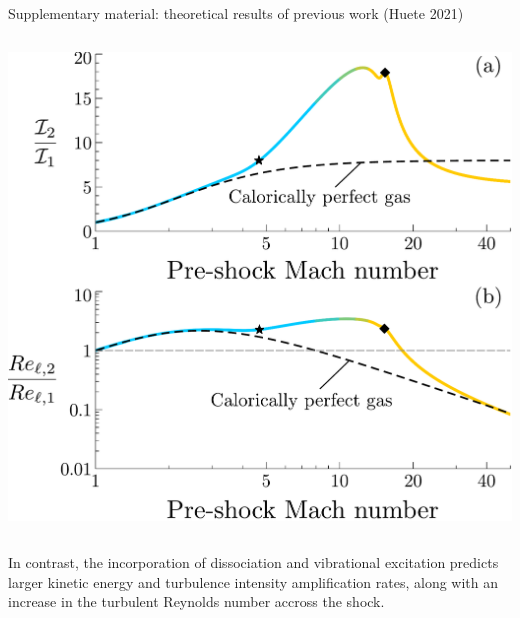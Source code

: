 \documentclass[9pt, aspectratio=1609]{beamer}
\begin{document}
\begin{frame}{\large Supplementary material: theoretical results of previous work (Huete 2021)}
\begin{columns}[c]
\begin{column}{.45\textwidth}
\begin{center}
        \includegraphics[width=1\textwidth]{figures/huete2021/Ratios_APS_alpha.pdf}
    \end{center}
    \end{column}%
\end{columns}
\vspace{0.3cm}
In contrast, the incorporation of dissociation and vibrational excitation predicts larger kinetic energy and turbulence intensity amplification rates, along with an increase in the turbulent Reynolds number accross the shock.
\end{frame}
\end{document}
